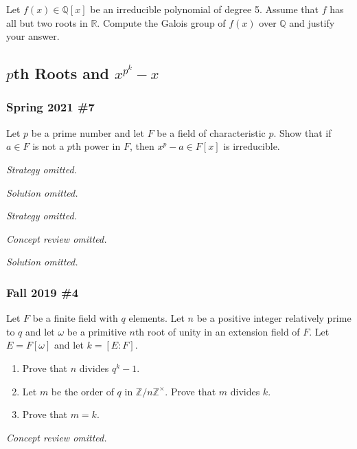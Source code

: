 Let \(f(x) \in {\mathbb{Q}}[x]\) be an irreducible polynomial of degree
5. Assume that \(f\) has all but two roots in \({\mathbb{R}}\). Compute
the Galois group of \(f(x)\) over \({\mathbb{Q}}\) and justify your
answer.

\hypertarget{pth-roots-and-xpk-x}{%
\subsection{\texorpdfstring{\(p\)th Roots and
\(x^{p^k}-x\)}{pth Roots and x\^{}\{p\^{}k\}-x}}\label{pth-roots-and-xpk-x}}

\hypertarget{spring-2021-7}{%
\subsubsection{Spring 2021 \#7}\label{spring-2021-7}}

Let \(p\) be a prime number and let \(F\) be a field of characteristic
\(p\). Show that if \(a\in F\) is not a \(p\)th power in \(F\), then
\(x^p-a \in F[x]\) is irreducible.

\emph{Strategy omitted.}

\emph{Solution omitted.}

\emph{Strategy omitted.}

\emph{Concept review omitted.}

\emph{Solution omitted.}

\hypertarget{fall-2019-4}{%
\subsubsection{Fall 2019 \#4}\label{fall-2019-4}}

Let \(F\) be a finite field with \(q\) elements. Let \(n\) be a positive
integer relatively prime to \(q\) and let \(\omega\) be a primitive
\(n\)th root of unity in an extension field of \(F\). Let
\(E = F [\omega]\) and let \(k = [E : F]\).

\begin{enumerate}
\def\labelenumi{\alph{enumi}.}
\item
  Prove that \(n\) divides \(q^{k}-1\).
\item
  Let \(m\) be the order of \(q\) in
  \({\mathbb{Z}}/n{\mathbb{Z}}^{\times}\). Prove that \(m\) divides
  \(k\).
\item
  Prove that \(m = k\).
\end{enumerate}


\emph{Concept review omitted.}

